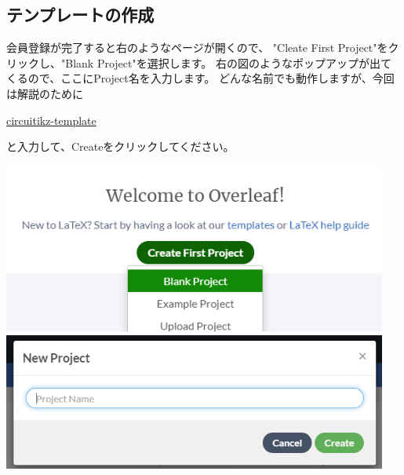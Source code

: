 		\subsection{テンプレートの作成}
			\noindent
			\begin{minipage}{0.4\hsize}%
				会員登録が完了すると右のようなページが開くので、
				"Cleate First Project"をクリックし、"Blank Project"を選択します。
				右の図のようなポップアップが出てくるので、ここにProject名を入力します。
				どんな名前でも動作しますが、今回は解説のために
				\begin{mdframed}[style=shadow]
					\url{circuitikz-template}
				\end{mdframed}\vspace{-3mm}
				と入力して、Createをクリックしてください。
			\end{minipage}\hfill
			\begin{minipage}{0.6\hsize}
				\begin{flushright}
					\includegraphics[width=0.95\textwidth]{overleaf-page-createproject.png}\\
					\vspace{3mm}
					\includegraphics[width=0.95\textwidth]{overleaf-page-projectname.png}
				\end{flushright}
			\end{minipage}

